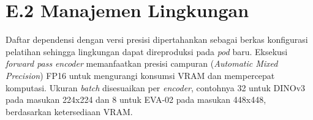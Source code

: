 \section*{E.2 Manajemen Lingkungan}

Daftar dependensi dengan versi presisi dipertahankan sebagai berkas konfigurasi pelatihan sehingga lingkungan dapat direproduksi pada \textit{pod} baru. Eksekusi \textit{forward pass} \textit{encoder} memanfaatkan presisi campuran (\textit{Automatic Mixed Precision}) FP16 untuk mengurangi konsumsi VRAM dan mempercepat komputasi. Ukuran \textit{batch} disesuaikan per \textit{encoder}, contohnya 32 untuk DINOv3 pada masukan 224x224 dan 8 untuk EVA-02 pada masukan 448x448, berdasarkan ketersediaan VRAM.
